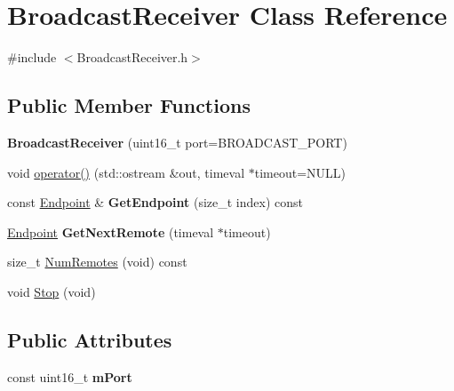 \hypertarget{class_broadcast_receiver}{\section{Broadcast\-Receiver Class Reference}
\label{class_broadcast_receiver}
}


{\ttfamily \#include $<$Broadcast\-Receiver.\-h$>$}

\subsection*{Public Member Functions}
\begin{DoxyCompactItemize}
\item 
\hypertarget{class_broadcast_receiver_a9c3f8ebdef813f03edec75f88389a6ee}{{\bfseries Broadcast\-Receiver} (uint16\-\_\-t port=B\-R\-O\-A\-D\-C\-A\-S\-T\-\_\-\-P\-O\-R\-T)}\label{class_broadcast_receiver_a9c3f8ebdef813f03edec75f88389a6ee}

\item 
void \hyperlink{class_broadcast_receiver_ac2fa6c783d73121c800d3c015621964d}{operator()} (std\-::ostream \&out, timeval $\ast$timeout=N\-U\-L\-L)
\item 
\hypertarget{class_broadcast_receiver_a1c487597e1338d5e5fca55f1d89d0eb1}{const \hyperlink{class_endpoint}{Endpoint} \& {\bfseries Get\-Endpoint} (size\-\_\-t index) const }\label{class_broadcast_receiver_a1c487597e1338d5e5fca55f1d89d0eb1}

\item 
\hypertarget{class_broadcast_receiver_a4549672ea1b9b008f93b42329c8bea5f}{\hyperlink{class_endpoint}{Endpoint} {\bfseries Get\-Next\-Remote} (timeval $\ast$timeout)}\label{class_broadcast_receiver_a4549672ea1b9b008f93b42329c8bea5f}

\item 
size\-\_\-t \hyperlink{class_broadcast_receiver_a6e403e696a76c5bc8c2b9215c3d5704d}{Num\-Remotes} (void) const 
\item 
void \hyperlink{class_broadcast_receiver_ab0f0852ab37655f23bebaca888216502}{Stop} (void)
\end{DoxyCompactItemize}
\subsection*{Public Attributes}
\begin{DoxyCompactItemize}
\item 
\hypertarget{class_broadcast_receiver_a3e1de2825034cb6e2b15641c490d9381}{const uint16\-\_\-t {\bfseries m\-Port}}\label{class_broadcast_receiver_a3e1de2825034cb6e2b15641c490d9381}

\end{DoxyCompactItemize}
